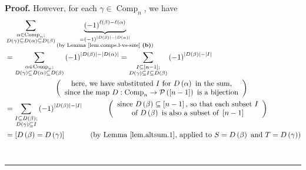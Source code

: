 \documentclass[numbers=enddot,12pt,final,onecolumn,notitlepage]{scrartcl}%
\theoremstyle{definition}
\newenvironment{proof}[1][Proof]{\noindent\textbf{#1.} }{\ \rule{0.5em}{0.5em}}
\let\sumnonlimits\sum
\renewcommand{\sum}{\sumnonlimits\limits}
\newenvironment{vershort}{}{}
\begin{document}
\begin{vershort}
\begin{proof}
However, for each $\gamma\in\operatorname*{Comp}\nolimits_{n}$, we have
\begin{align*}
&  \sum_{\substack{\alpha\in\operatorname*{Comp}\nolimits_{n};\\D\left(
\gamma\right)  \subseteq D\left(  \alpha\right)  \subseteq D\left(
\beta\right)  }}\underbrace{\left(  -1\right)  ^{\ell\left(  \beta\right)
-\ell\left(  \alpha\right)  }}_{\substack{=\left(  -1\right)  ^{\left\vert
D\left(  \beta\right)  \right\vert -\left\vert D\left(  \alpha\right)
\right\vert }\\\text{(by Lemma \ref{lem.comps.l-vs-size} \textbf{(b)})}}}\\
&  =\sum_{\substack{\alpha\in\operatorname*{Comp}\nolimits_{n};\\D\left(
\gamma\right)  \subseteq D\left(  \alpha\right)  \subseteq D\left(
\beta\right)  }}\left(  -1\right)  ^{\left\vert D\left(  \beta\right)
\right\vert -\left\vert D\left(  \alpha\right)  \right\vert }=\sum
_{\substack{I\subseteq\left[  n-1\right]  ;\\D\left(  \gamma\right)  \subseteq
I\subseteq D\left(  \beta\right)  }}\left(  -1\right)  ^{\left\vert D\left(
\beta\right)  \right\vert -\left\vert I\right\vert }\\
&  \ \ \ \ \ \ \ \ \ \ \ \ \ \ \ \ \ \ \ \ \left(
\begin{array}
[c]{c}%
\text{here, we have substituted }I\text{ for }D\left(  \alpha\right)  \text{
in the sum,}\\
\text{since the map }D:\operatorname*{Comp}\nolimits_{n}\rightarrow
\mathcal{P}\left(  \left[  n-1\right]  \right)  \text{ is a bijection}%
\end{array}
\right) \\
&  =\sum_{\substack{I\subseteq D\left(  \beta\right)  ;\\D\left(
\gamma\right)  \subseteq I}}\left(  -1\right)  ^{\left\vert D\left(
\beta\right)  \right\vert -\left\vert I\right\vert }%
\ \ \ \ \ \ \ \ \ \ \left(
\begin{array}
[c]{c}%
\text{since }D\left(  \beta\right)  \subseteq\left[  n-1\right]  \text{, so
that each subset }I\\
\text{of }D\left(  \beta\right)  \text{ is also a subset of }\left[
n-1\right]
\end{array}
\right) \\
&  =\left[  D\left(  \beta\right)  =D\left(  \gamma\right)  \right]
\ \ \ \ \ \ \ \ \ \ \left(  \text{by Lemma \ref{lem.altsum.1}, applied to
}S=D\left(  \beta\right)  \text{ and }T=D\left(  \gamma\right)  \right) \\

\end{align*}
\end{proof}
\end{vershort}
\end{document}
